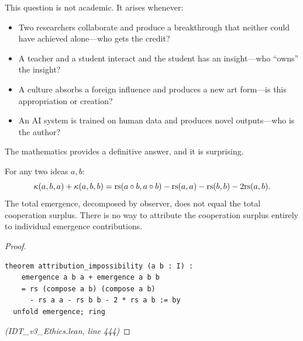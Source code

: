 This question is not academic. It arises whenever:
\begin{itemize}
\item Two researchers collaborate and produce a breakthrough that neither could
have achieved alone---who gets the credit?
\item A teacher and a student interact and the student has an insight---who
``owns'' the insight?
\item A culture absorbs a foreign influence and produces a new art form---is
this appropriation or creation?
\item An AI system is trained on human data and produces novel outputs---who
is the author?
\end{itemize}

The mathematics provides a definitive answer, and it is surprising.

\begin{theorem}
\label{thm:attribution-impossibility}
For any two ideas $a, b$:
\[
  \kappa(a, b, a) + \kappa(a, b, b) = \mathrm{rs}(a \circ b, a \circ b) - \mathrm{rs}(a,a) - \mathrm{rs}(b,b) - 2\mathrm{rs}(a,b).
\]
The total emergence, decomposed by observer, does not equal the total
cooperation surplus. There is no way to attribute the cooperation surplus
entirely to individual emergence contributions.
\end{theorem}

\begin{proof}
\begin{lstlisting}
theorem attribution_impossibility (a b : I) :
    emergence a b a + emergence a b b
    = rs (compose a b) (compose a b)
      - rs a a - rs b b - 2 * rs a b := by
  unfold emergence; ring
\end{lstlisting}
\textit{(IDT\_v3\_Ethics.lean, line 444)}
\end{proof}

